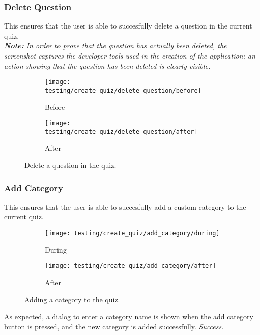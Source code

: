 \subsubsection{Delete Question} %
\label{ssub:delete_question}
This ensures that the user is able to succesfully delete a question in the current quiz.\\
\textit{\textbf{Note:} In order to prove that the question has actually been deleted, the screenshot captures the developer tools used in the creation of the application; an action showing that the question has been deleted is clearly visible.}
\begin{figure}[!htbp]
\centering
\begin{subfigure}{0.5\textwidth}
  \centering
  \texttt{[image: testing/create\_quiz/delete\_question/before]}
  \caption{Before}
  \label{fig:sub1}
\end{subfigure}%
\begin{subfigure}{0.5\textwidth}
  \centering
  \texttt{[image: testing/create\_quiz/delete\_question/after]}
  \caption{After}
  \label{fig:sub2}
\end{subfigure}
\caption{Delete a question in the quiz.}
\label{fig:test}
\end{figure}


\subsubsection{Add Category} %
\label{ssub:add_category}
This ensures that the user is able to succesfully add a custom category to the current quiz.
\begin{figure}[!htbp]
\centering
\begin{subfigure}{0.5\textwidth}
  \centering
  \texttt{[image: testing/create\_quiz/add\_category/during]}
  \caption{During}
  \label{fig:sub1}
\end{subfigure}%
\begin{subfigure}{0.5\textwidth}
  \centering
  \texttt{[image: testing/create\_quiz/add\_category/after]}
  \caption{After}
  \label{fig:sub2}
\end{subfigure}
\caption{Adding a category to the quiz.}
\label{fig:test}
\end{figure}
As expected, a dialog to enter a category name is shown when the add category button is pressed, and the new category is added successfully. \textit{Success.}


